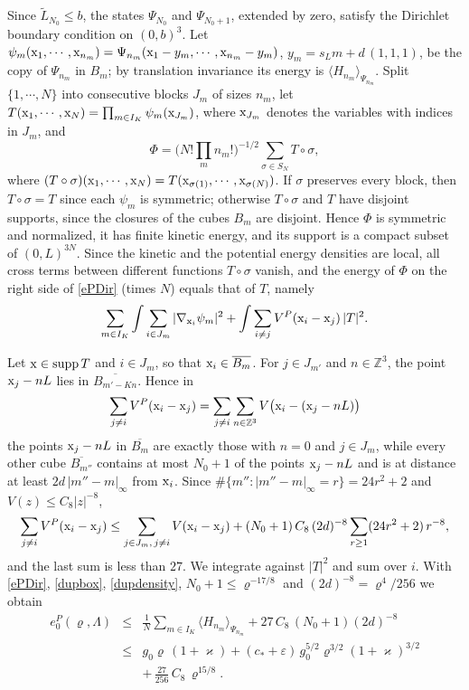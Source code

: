 \documentclass[11pt]{article}
\numberwithin{equation}{section}
\newcommand{\e}{\varepsilon}
\newcommand{\x}{{\rm x}}
\newcommand{\beqa}{\begin{eqnarray}}
\newcommand{\eeqa}{\end{eqnarray}}
\newcommand\Z{{\mathbb Z}}
\renewcommand\kappa\varkappa
\renewcommand\rho\varrho
\theoremstyle{definition}
\begin{document}
\smallskip{}
Since $\widetilde L_{N_0}\leq b$, the states $\Psi_{N_0}$ and $\Psi_{N_0+1}$, extended by zero, satisfy the Dirichlet boundary condition on $(0,b)^3$.
Let $\psi_m(\x_1,\cdots,\x_{n_m})=\Psi_{n_m}(\x_1-y_m,\cdots,\x_{n_m}-y_m)$, $y_m=s_Lm+d\,(1,1,1)$, be the copy of $\Psi_{n_m}$ in $B_m$;
by translation invariance its energy is $\langle H_{n_m}\rangle_{\Psi_{n_m}}$.
Split $\{1,\cdots,N\}$ into consecutive blocks $J_m$ of sizes $n_m$, let $T(\x_1,\cdots,\x_N)=\prod_{m\in I_K}\psi_m(\x_{J_m})$, where $\x_{J_m}$ denotes the variables with indices in $J_m$, and
\[
\Phi=\Big(N!\prod_mn_m!\Big)^{-1/2}\sum_{\sigma\in S_N}T\circ\sigma ,
\]
where $(T\circ\sigma)(\x_1,\cdots,\x_N)=T(\x_{\sigma(1)},\cdots,\x_{\sigma(N)})$.
If $\sigma$ preserves every block, then $T\circ\sigma=T$ since each $\psi_m$ is symmetric; otherwise $T\circ\sigma$ and $T$ have disjoint supports, since the closures of the cubes $B_m$ are disjoint.
Hence $\Phi$ is symmetric and normalized, it has finite kinetic energy, and its support is a compact subset of $(0,L)^{3N}$.
Since the kinetic and the potential energy densities are local, all cross terms between different functions $T\circ\sigma$ vanish, and the energy of $\Phi$ on the right side of \eqref{ePDir} (times $N$) equals that of $T$, namely
\[
\sum_{m\in I_K}\int\sum_{i\in J_m}|\nabla_{\x_i}\psi_m|^2+\int\sum_{i\neq j}V^P(\x_i-\x_j)\,|T|^2 .
\]

\smallskip{}
Let $\x\in{\rm supp}\,T$ and $i\in J_m$, so that $\x_i\in\overline{B_m}$. For $j\in J_{m'}$ and $n\in\Z^3$, the point $\x_j-nL$ lies in $\overline{B_{m'-Kn}}$. Hence in
\[
\sum_{j\neq i}V^P(\x_i-\x_j)=\sum_{j\neq i}\sum_{n\in\Z^3}V\big(\x_i-(\x_j-nL)\big)
\]
the points $\x_j-nL$ in $\overline{B_m}$ are exactly those with $n=0$ and $j\in J_m$, while every other cube $\overline{B_{m''}}$ contains at most $N_0+1$ of the points $\x_j-nL$
and is at distance at least $2d\,|m''-m|_\infty$ from $\x_i$. Since $\#\{m'':|m''-m|_\infty=r\}=24r^2+2$ and $V(z)\leq C_8|z|^{-8}$,
\[
\sum_{j\neq i}V^P(\x_i-\x_j)\leq\sum_{j\in J_m,\,j\neq i}V(\x_i-\x_j)+(N_0+1)\,C_8\,(2d)^{-8}\sum_{r\geq1}(24r^2+2)\,r^{-8},
\]
and the last sum is less than $27$. We integrate against $|T|^2$ and sum over $i$. With \eqref{ePDir}, \eqref{dupbox}, \eqref{dupdensity}, $N_0+1\leq\rho^{-17/8}$ and $(2d)^{-8}=\rho^4/256$ we obtain
\beqa\nonumber
e_0^P(\rho,\Lambda)&\leq&\frac1N\sum_{m\in I_K}\langle H_{n_m}\rangle_{\Psi_{n_m}}+27\,C_8\,(N_0+1)(2d)^{-8}\nonumber\\
&\leq&g_0\rho\,(1+\kappa)+(c_*+\e)\,g_0^{5/2}\rho^{3/2}(1+\kappa)^{3/2}\nonumber\\\label{dupfinal}
&&+\,\frac{27}{256}\,C_8\,\rho^{15/8}.
\eeqa
\end{document}
